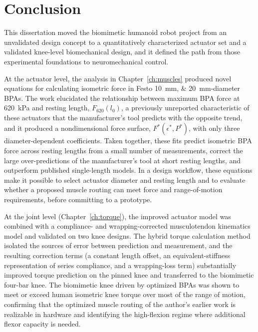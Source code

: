 \chapter{Conclusion}\label{ch:conclusion}
\graphicspath{{D:/Github/Bipedal_Robot/Documentation/Reports and Papers/Dissertation/Figures/80-conclusion/}{figs/80-conclusion/}}

This dissertation moved the biomimetic humanoid robot project from an unvalidated design concept to a quantitatively characterized actuator set and a validated knee-level biomechanical design, and it defined the path from those experimental foundations to neuromechanical control.

At the actuator level, the analysis in Chapter~\ref{ch:muscles} produced novel equations for calculating isometric force in Festo \qtylist{10;20}{\mm}-diameter BPAs. The work elucidated the relationship between maximum BPA force at \qty{620}{\kPa} and resting length, $F_{620}(l_0)$, a previously unreported characteristic of these actuators that the manufacturer's tool predicts with the opposite trend, and it produced a nondimensional force surface, $F^*(\epsilon^*,P^*)$, with only three diameter-dependent coefficients. Taken together, these fits predict isometric BPA force across resting lengths from a small number of measurements, correct the large over-predictions of the manufacturer's tool at short resting lengths, and outperform published single-length models. In a design workflow, these equations make it possible to select actuator diameter and resting length and to evaluate whether a proposed muscle routing can meet force and range-of-motion requirements, before committing to a prototype.

At the joint level (Chapter~\ref{ch:torque}), the improved actuator model was combined with a compliance- and wrapping-corrected musculotendon kinematics model and validated on two knee designs. The hybrid torque calculation method isolated the sources of error between prediction and measurement, and the resulting correction terms (a constant length offset, an equivalent-stiffness representation of series compliance, and a wrapping-loss term) substantially improved torque prediction on the pinned knee and transferred to the biomimetic four-bar knee. The biomimetic knee driven by optimized BPAs was shown to meet or exceed human isometric knee torque over most of the range of motion, confirming that the optimized muscle routing of the author's earlier work is realizable in hardware and identifying the high-flexion regime where additional flexor capacity is needed.

